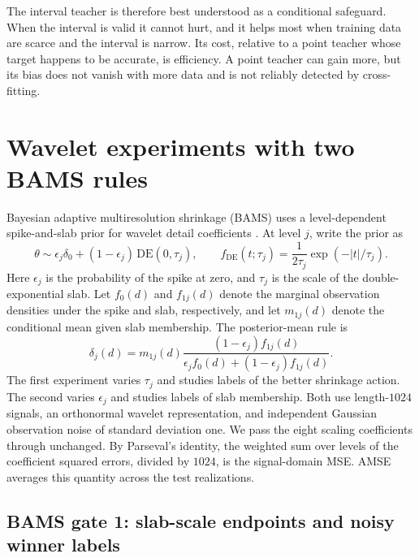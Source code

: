 \documentclass[11pt]{article}
\theoremstyle{plain}
\theoremstyle{definition}
\theoremstyle{remark}
\begin{document}
The interval teacher is therefore best understood as a conditional safeguard. When the interval
is valid it cannot hurt, and it helps most when training data are scarce and the interval is
narrow. Its cost, relative to a point teacher whose target happens to be accurate, is
efficiency. A point teacher can gain more, but its bias does not vanish with more data and is
not reliably detected by cross-fitting.

\section{Wavelet experiments with two BAMS rules}\label{sec:waveplan}

Bayesian adaptive multiresolution shrinkage (BAMS) uses a level-dependent
spike-and-slab prior for wavelet detail coefficients \citep{vidakovic2001bams}.
At level $j$, write the prior as
$$
\theta\sim\epsilon_j\delta_0+(1-\epsilon_j)\,\mathrm{DE}(0,\tau_j),
\qquad f_{\mathrm{DE}}(t;\tau_j)=\frac{1}{2\tau_j}\exp(-|t|/\tau_j).
$$
Here $\epsilon_j$ is the probability of the spike at zero, and $\tau_j$ is the
scale of the double-exponential slab. Let $f_0(d)$ and $f_{1j}(d)$ denote the
marginal observation densities under the spike and slab, respectively, and
let $m_{1j}(d)$ denote the conditional mean given slab membership. The
posterior-mean rule is
$$
\delta_j(d)=m_{1j}(d)
\frac{(1-\epsilon_j)f_{1j}(d)}
     {\epsilon_j f_0(d)+(1-\epsilon_j)f_{1j}(d)}.
$$
The first experiment varies $\tau_j$ and studies labels of the better
shrinkage action. The second varies $\epsilon_j$ and studies labels of slab
membership. Both use length-$1024$ signals, an orthonormal wavelet
representation, and independent Gaussian observation noise of standard
deviation one. We pass the eight scaling coefficients through unchanged.
By Parseval's identity, the weighted sum over levels of the coefficient
squared errors, divided by $1024$, is the signal-domain MSE. AMSE averages
this quantity across the test realizations.

\subsection{BAMS gate 1: slab-scale endpoints and noisy winner labels}
\label{subsec:bams-gate1}
\end{document}
